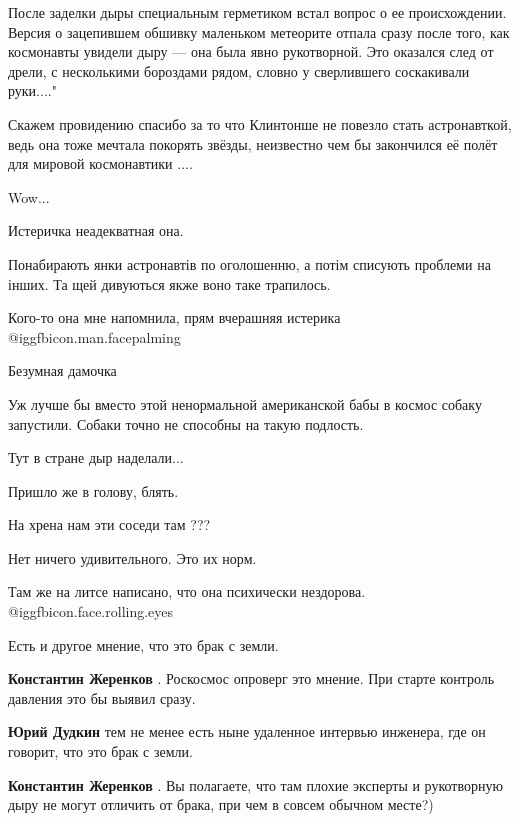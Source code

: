 \begin{itemize}
После заделки дыры специальным герметиком встал вопрос о ее происхождении.
Версия о зацепившем обшивку маленьком метеорите отпала сразу после того, как
космонавты увидели дыру — она была явно рукотворной. Это оказался след от
дрели, с несколькими бороздами рядом, словно у сверлившего соскакивали
руки...."



Скажем провидению спасибо за то что Клинтонше не повезло стать астронавткой,
ведь она тоже мечтала покорять звёзды, неизвестно чем бы закончился её полёт
для мировой космонавтики ....

Wow...

Истеричка неадекватная она.

Понабирають янки астронавтів по оголошенню, а потім списують проблеми на інших. Та щей дивуються якже воно таке трапилось.

Кого-то она мне напомнила, прям вчерашняя истерика  @igg{fbicon.man.facepalming} 

Безумная дамочка

Уж лучше бы вместо этой ненормальной американской бабы в космос собаку запустили. Собаки точно не способны на такую подлость.

Тут в стране дыр наделали...

Пришло же в голову, блять.

На хрена нам эти соседи там ???

Нет ничего удивительного. Это их норм.

Там же на литсе написано, что она психически нездорова.
 @igg{fbicon.face.rolling.eyes} 

Есть и другое мнение, что это брак с земли.

\begin{itemize} %
\textbf{Константин Жеренков} . Роскосмос опроверг это мнение. При старте контроль давления это бы выявил сразу.

\textbf{Юрий Дудкин} тем не менее есть ныне удаленное интервью инженера, где он говорит, что это брак с земли.


\textbf{Константин Жеренков} . Вы полагаете, что там плохие эксперты и рукотворную дыру не могут отличить от брака, при чем в совсем обычном месте?)


\end{itemize}
\end{itemize}
